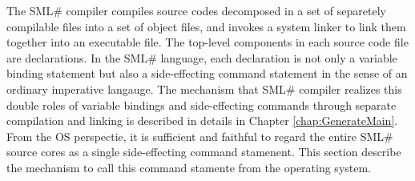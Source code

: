 \documentclass{jbook}
\newcommand{\smlsharp}{SML\#}
\begin{document}
	The \smlsharp{} compiler compiles source codes decomposed in a
set of separetely compilable files into a set of object files, and
invokes a system linker to link them together into an executable file.
	The top-level components in each source code file are 
declarations.
	In the \smlsharp{} language, each declaration is not only a
variable binding statement but also a side-effecting command 
statement in the sense of an ordinary imperative langauge.
	The mechanism that \smlsharp{} compiler realizes this double
roles of variable bindings and side-effecting commands through separate
compilation and linking is described in details in Chapter
\ref{chap:GenerateMain}.
	From the OS perspectie, it is sufficient and faithful to regard
the entire \smlsharp{} source cores as a single side-effecting command
stamenent.
	This section describe the mechanism to call this command
stamente from the operating system.
\fi%
\end{document}
